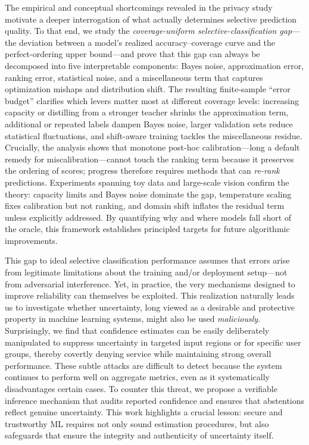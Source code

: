 The empirical and conceptual shortcomings revealed in the privacy study motivate a deeper interrogation of what actually determines selective prediction quality. To that end, we study the \emph{coverage-uniform selective-classification gap}—the deviation between a model's realized accuracy–coverage curve and the perfect-ordering upper bound—and prove that this gap can always be decomposed into five interpretable components: Bayes noise, approximation error, ranking error, statistical noise, and a miscellaneous term that captures optimization mishaps and distribution shift. The resulting finite-sample “error budget” clarifies which levers matter most at different coverage levels: increasing capacity or distilling from a stronger teacher shrinks the approximation term, additional or repeated labels dampen Bayes noise, larger validation sets reduce statistical fluctuations, and shift-aware training tackles the miscellaneous residue. Crucially, the analysis shows that monotone post-hoc calibration—long a default remedy for miscalibration—cannot touch the ranking term because it preserves the ordering of scores; progress therefore requires methods that can \emph{re-rank} predictions. Experiments spanning toy data and large-scale vision confirm the theory: capacity limits and Bayes noise dominate the gap, temperature scaling fixes calibration but not ranking, and domain shift inflates the residual term unless explicitly addressed. By quantifying why and where models fall short of the oracle, this framework establishes principled targets for future algorithmic improvements.

This gap to ideal selective classification performance assumes that errors arise from legitimate limitations about the training and/or deployment setup—not from adversarial interference. Yet, in practice, the very mechanisms designed to improve reliability can themselves be exploited. This realization naturally leads us to investigate whether uncertainty, long viewed as a desirable and protective property in machine learning systems, might also be used \emph{maliciously}. Surprisingly, we find that confidence estimates can be easily deliberately manipulated to suppress uncertainty in targeted input regions or for specific user groups, thereby covertly denying service while maintaining strong overall performance. These subtle attacks are difficult to detect because the system continues to perform well on aggregate metrics, even as it systematically disadvantages certain cases. To counter this threat, we propose a verifiable inference mechanism that audits reported confidence and ensures that abstentions reflect genuine uncertainty. This work highlights a crucial lesson: secure and trustworthy ML requires not only sound estimation procedures, but also safeguards that ensure the integrity and authenticity of uncertainty itself.

